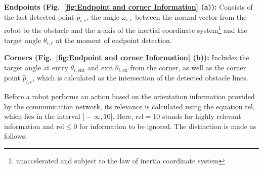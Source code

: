 \documentclass[conference]{IEEEtran}
\begin{document}
\textbf{Endpoints (Fig.~\ref{fig:Endpoint and corner Information} (a)):} 
Consists of the last detected point \( \hat{p}_{i,e} \), the angle \( \omega_{i,e} \) 
between the normal vector from the robot to the obstacle and the x-axis of the inertial 
coordinate system\footnote{unaccelerated and subject to the law of inertia 
coordinate system} and the target angle \( \theta_{i,e} \) at the moment of endpoint detection.

\textbf{Corners (Fig.~\ref{fig:Endpoint and corner Information} (b)):} 
Includes the target angle at entry \( \theta_{i,\mathrm{ent}} \) and exit 
\( \theta_{i,\mathrm{ex}} \) from the corner, as well as the corner point \( \hat{p}_{i,c} \), 
which is calculated as the intersection of the detected obstacle lines.

Before a robot performs an action based on the orientation information provided by 
the communication network, its relevance is calculated using the equation \( \mathrm{rel} \), 
which lies in the interval \( ]-\infty, 10] \). Here, \( \mathrm{rel}=10 \) stands for 
highly relevant information and \( \mathrm{rel} \leq 0 \) for information to be ignored. 
The distinction is made as follows:
\end{document}
